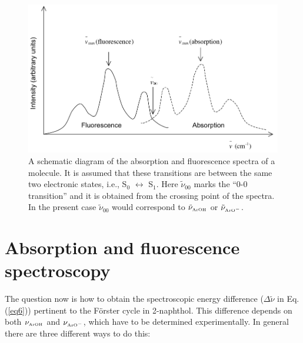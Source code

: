 \documentclass[byrevtex,amssymb,aps,pra,floatfix,letterpaper]{revtex4}
\begin{document}
\begin{figure}[!htp]
\begin{center}
\includegraphics[scale=0.5]{fig3}
\caption{A schematic diagram of the absorption and fluorescence spectra of a molecule. It is assumed that these transitions are between the same two electronic states, i.e., S$_0$ $\leftrightarrow$ S$_1$. Here $\tilde{\nu}_{00}$ marks the ``0-0 transition'' and it is obtained from the crossing point of the spectra. In the present case $\tilde{\nu}_{00}$ would correspond to $\tilde{\nu}_\textnormal{\tiny ArOH}$ or $\tilde{\nu}_{\textnormal{\tiny ArO}^-}$.}
\label{fig3}
\end{center}
\end{figure}

\section{Absorption and fluorescence spectroscopy}

The question now is how to obtain the spectroscopic energy difference ($\Delta\tilde{\nu}$ in Eq. (\ref{eq6})) pertinent to the F\"orster cycle in 2-naphthol. This difference depends on both $\nu_\textnormal{\tiny ArOH}$ and $\nu_{\textnormal{\tiny ArO}^-}$, which have to be determined experimentally. In general there are three different ways to do this:
\end{document}

